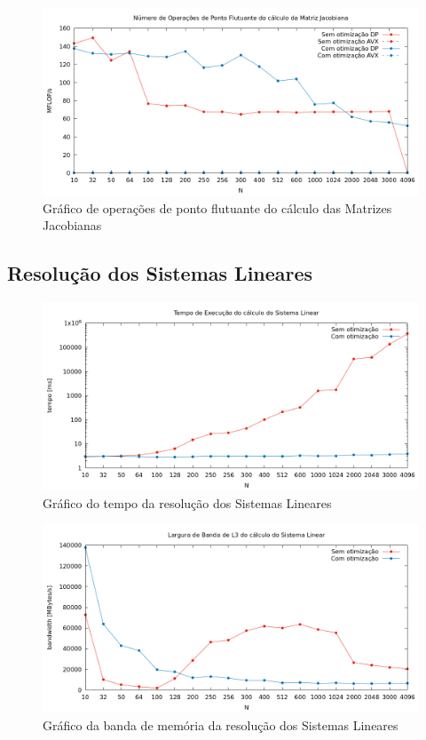\documentclass{article}
\begin{document}
\begin{figure}[htp]
    \centering
    \includegraphics[width=12cm]{flops_dp_jacobiana.png}
    \caption{Gráfico de operações de ponto flutuante do cálculo das Matrizes Jacobianas}
    \label{fig:flops_jac}
\end{figure}

\newpage
\subsection{Resolução dos Sistemas Lineares}

\begin{figure}[htp]
    \centering
    \includegraphics[width=12cm]{tempo_sistema_linear.png}
    \caption{Gráfico do tempo da resolução dos Sistemas Lineares}
    \label{fig:tempo_sl}
\end{figure}

\begin{figure}[htp]
    \centering
    \includegraphics[width=12cm]{l3_sistema_linear.png}
    \caption{Gráfico da banda de memória da resolução dos Sistemas Lineares}
    \label{fig:l3_sl}
\end{figure}
\end{document}

